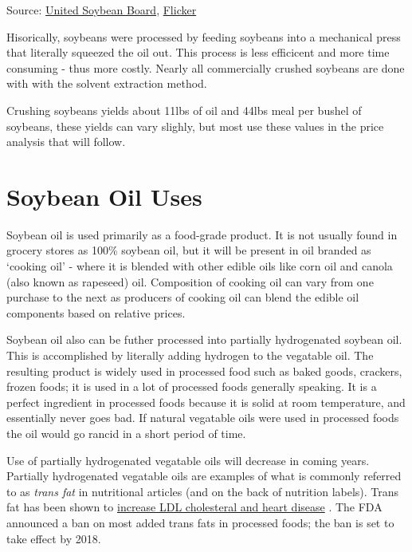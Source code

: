 \documentclass[]{book}
\theoremstyle{definition}
\theoremstyle{definition}
\theoremstyle{remark}
\begin{document}
Source: \href{http://unitedsoybean.org/}{United Soybean Board},
\href{https://www.flickr.com/photos/unitedsoybean/10058954054/}{Flicker}

Hisorically, soybeans were processed by feeding soybeans into a
mechanical press that literally squeezed the oil out. This process is
less efficicent and more time consuming - thus more costly. Nearly all
commercially crushed soybeans are done with with the solvent extraction
method.

Crushing soybeans yields about 11lbs of oil and 44lbs meal per bushel of
soybeans, these yields can vary slighly, but most use these values in
the price analysis that will follow.

\section{Soybean Oil Uses}\label{soybean-oil-uses}

Soybean oil is used primarily as a food-grade product. It is not usually
found in grocery stores as 100\% soybean oil, but it will be present in
oil branded as `cooking oil' - where it is blended with other edible
oils like corn oil and canola (also known as rapeseed) oil. Composition
of cooking oil can vary from one purchase to the next as producers of
cooking oil can blend the edible oil components based on relative
prices.

Soybean oil also can be futher processed into partially hydrogenated
soybean oil. This is accomplished by literally adding hydrogen to the
vegatable oil. The resulting product is widely used in processed food
such as baked goods, crackers, frozen foods; it is used in a lot of
processed foods generally speaking. It is a perfect ingredient in
processed foods because it is solid at room temperature, and essentially
never goes bad. If natural vegatable oils were used in processed foods
the oil would go rancid in a short period of time.

Use of partially hydrogenated vegatable oils will decrease in coming
years. Partially hydrogenated vegatable oils are examples of what is
commonly referred to as \emph{trans fat} in nutritional articles (and on
the back of nutrition labels). Trans fat has been shown to
\href{http://www.fda.gov/ForConsumers/ConsumerUpdates/ucm372915.htm}{increase
LDL cholesteral and heart disease} \citep{dri2002Nap}. The FDA announced
a ban on most added trans fats in processed foods; the ban is set to
take effect by 2018.
\end{document}

